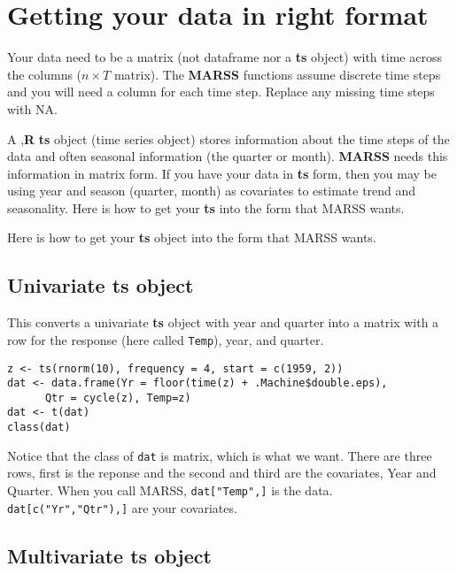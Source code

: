 \documentclass[12pt,]{book}
\begin{document}
\hypertarget{getting-your-data-in-right-format}{%
\chapter{Getting your data in right format}\label{getting-your-data-in-right-format}}

Your data need to be a matrix (not dataframe nor a \textbf{ts} object) with time across the columns (\(n \times T\) matrix). The \textbf{MARSS} functions assume discrete time steps and you will need a column for each time step. Replace any missing time steps with NA.

A ,\textbf{R} \textbf{ts} object (time series object) stores information about the time steps of the data and often seasonal information (the quarter or month). \textbf{MARSS} needs this information in matrix form. If you have your data in \textbf{ts} form, then you may be using year and season (quarter, month) as covariates to estimate trend and seasonality. Here is how to get your \textbf{ts} into the form that MARSS wants.

Here is how to get your \textbf{ts} object into the form that MARSS wants.

\hypertarget{univariate-ts-object}{%
\section{\texorpdfstring{Univariate \textbf{ts} object}{Univariate ts object}}\label{univariate-ts-object}}

This converts a univariate \textbf{ts} object with year and quarter into a matrix with a row for the response (here called \texttt{Temp}), year, and quarter.

\begin{verbatim}
z <- ts(rnorm(10), frequency = 4, start = c(1959, 2))
dat <- data.frame(Yr = floor(time(z) + .Machine$double.eps), 
      Qtr = cycle(z), Temp=z)
dat <- t(dat)
class(dat)
\end{verbatim}

Notice that the class of \texttt{dat} is matrix, which is what we want. There are three rows, first is the reponse and the second and third are the covariates, Year and Quarter. When you call MARSS, \texttt{dat{[}"Temp",{]}} is the data. \texttt{dat{[}c("Yr","Qtr"),{]}} are your covariates.

\hypertarget{multivariate-ts-object}{%
\section{\texorpdfstring{Multivariate \textbf{ts} object}{Multivariate ts object}}\label{multivariate-ts-object}}
\end{document}
